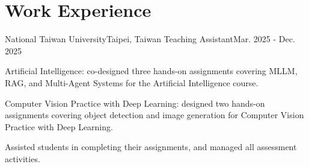 \section{\textbf{Work Experience}}
  \resumeSubHeadingListStart
    \resumeSubheading
      {National Taiwan University}{Taipei, Taiwan}
      {Teaching Assistant}{Mar. 2025 - Dec. 2025}
      \vspace{-3mm}
      \resumeItemListStart
          \item Artificial Intelligence: co-designed three hands-on assignments covering MLLM, RAG, and Multi-Agent Systems for the Artificial Intelligence course.
          \item Computer Vision Practice with Deep Learning: designed two hands-on assignments covering object detection and image generation for Computer Vision Practice with Deep Learning.
          \item Assisted students in completing their assignments, and managed all assessment activities.
      \resumeItemListEnd
\resumeSubHeadingListEnd

\vspace{-12pt}
